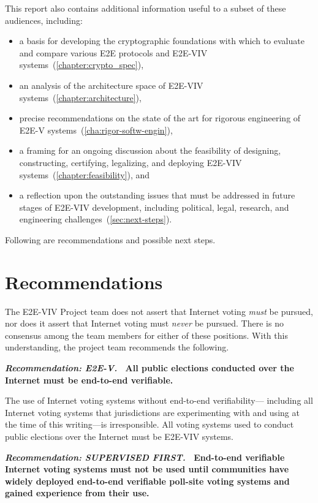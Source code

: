 This report also contains additional information useful to a subset of
these audiences, including:
\begin{itemize}
\item a basis for developing the cryptographic foundations with which
  to evaluate and compare various E2E protocols and E2E-VIV
  systems~(\autoref{chapter:crypto_spec}),
\item an analysis of the architecture space of E2E-VIV
  systems~(\autoref{chapter:architecture}),
\item precise recommendations on the state of the art for rigorous
  engineering of E2E-V systems~(\autoref{cha:rigor-softw-engin}),
\item a framing for an ongoing discussion about the feasibility of
  designing, constructing, certifying, legalizing, and deploying
  E2E-VIV systems~(\autoref{chapter:feasibility}), and
\item a reflection upon the outstanding issues that must be addressed
  in future stages of E2E-VIV development, including political, legal,
  research, and engineering challenges~(\autoref{sec:next-steps}).
\end{itemize}

Following are recommendations and possible next steps.

\section{Recommendations}

The E2E-VIV Project team does not assert that Internet voting
\emph{must} be pursued, nor does it assert that Internet voting must
\emph{never} be pursued. There is no consensus among the team members
for either of these positions. With this understanding, the project
team recommends the following.

\vspace{12pt} 
\textbf{\emph{Recommendation: E2E-V.} \ All public elections conducted
  over the Internet must be end-to-end verifiable.} 

The use of Internet voting systems without end-to-end verifiability---
including all Internet voting systems that jurisdictions are
experimenting with and using at the time of this writing---is
irresponsible. All voting systems used to conduct public elections
over the Internet must be E2E-VIV systems.

\vspace{12pt}
\textbf{\emph{Recommendation: SUPERVISED FIRST.} \ End-to-end
  verifiable Internet voting systems must not be used until
  communities have widely deployed end-to-end verifiable poll-site
  voting systems and gained experience from their use.}

